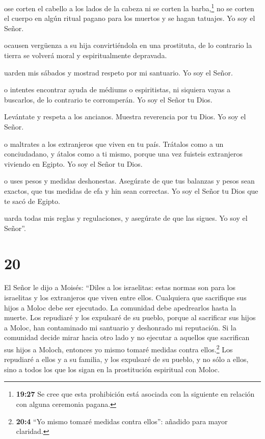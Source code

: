  ose corten el cabello a los lados de la cabeza ni se
corten la barba,\footnote{\textbf{19:27} Se cree que esta prohibición
  está asociada con la siguiente en relación con alguna ceremonia
  pagana.}  no se corten el cuerpo en algún ritual pagano
para los muertos y se hagan tatuajes. Yo soy el Señor.

 ocausen vergüenza a su hija convirtiéndola en una
prostituta, de lo contrario la tierra se volverá moral y espiritualmente
depravada.

 uarden mis sábados y mostrad respeto por mi santuario. Yo
soy el Señor.

 o intentes encontrar ayuda de médiums o espiritistas, ni
siquiera vayas a buscarlos, de lo contrario te corromperán. Yo soy el
Señor tu Dios.

 Levántate y respeta a los ancianos. Muestra reverencia por
tu Dios. Yo soy el Señor.

 o maltrates a los extranjeros que viven en tu país.
 Trátalos como a un conciudadano, y átalos como a ti mismo,
porque una vez fuisteis extranjeros viviendo en Egipto. Yo soy el Señor
tu Dios.

 o uses pesos y medidas deshonestas. 
Asegúrate de que tus balanzas y pesos sean exactos, que tus medidas de
efa y hin sean correctas. Yo soy el Señor tu Dios que te sacó de Egipto.

 uarda todas mis reglas y regulaciones, y asegúrate de que
las sigues. Yo soy el Señor''.

\hypertarget{section-19}{%
\section{20}\label{section-19}}

 El Señor le dijo a Moisés:  ``Diles a los
israelitas: estas normas son para los israelitas y los extranjeros que
viven entre ellos. Cualquiera que sacrifique sus hijos a Moloc debe ser
ejecutado. La comunidad debe apedrearlos hasta la muerte. 
Los repudiaré y los expulsaré de su pueblo, porque al sacrificar sus
hijos a Moloc, han contaminado mi santuario y deshonrado mi reputación.
 Si la comunidad decide mirar hacia otro lado y no ejecutar
a aquellos que sacrifican sus hijos a Moloch, entonces yo mismo tomaré
medidas contra ellos.\footnote{\textbf{20:4} ``Yo mismo tomaré medidas
  contra ellos'': añadido para mayor claridad.}  Los
repudiaré a ellos y a su familia, y los expulsaré de su pueblo, y no
sólo a ellos, sino a todos los que los sigan en la prostitución
espiritual con Moloc.

